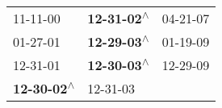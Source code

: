 \begin{supertabular}{lll}
                  11-11-00\textsuperscript{} &  \textbf{12-31-02\textsuperscript{$\wedge$}} &  04-21-07\textsuperscript{} \\
                  01-27-01\textsuperscript{} &  \textbf{12-29-03\textsuperscript{$\wedge$}} &  01-19-09\textsuperscript{} \\
                  12-31-01\textsuperscript{} &  \textbf{12-30-03\textsuperscript{$\wedge$}} &  12-29-09\textsuperscript{} \\
 \textbf{12-30-02\textsuperscript{$\wedge$}} &                   12-31-03\textsuperscript{} &                             \\
\end{supertabular}
